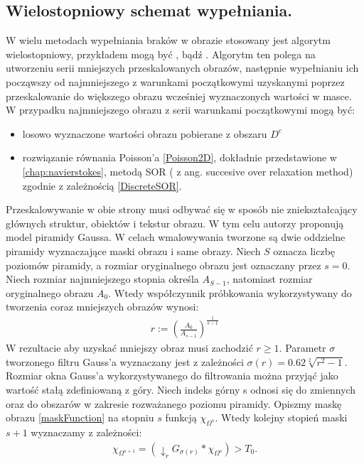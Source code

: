 \documentclass[12pt, twoside, openany]{report}
\theoremstyle{definition}
\begin{document}
\subsection{Wielostopniowy schemat wypełniania.}
W wielu metodach wypełniania braków w obrazie stosowany jest algorytm wielostopniowy, przykładem mogą być \cite{kawai2009image}, \cite{komodakis2007image} bądź \cite{wexler2007space}. Algorytm ten polega na utworzeniu serii mniejszych przeskalowanych obrazów, następnie wypełnianiu ich począwszy od najmniejszego z warunkami początkowymi uzyskanymi poprzez przeskalowanie do większego obrazu wcześniej wyznaczonych wartości w masce. W przypadku najmniejszego obrazu z serii warunkami początkowymi mogą być:
\begin{itemize}
\item
losowo wyznaczone wartości obrazu pobierane z obszaru $D^c$
\item
rozwiązanie równania Poisson'a \eqref{Poisson2D}, dokładnie przedstawione w \autoref{chap:navierstokes}, metodą SOR ( z ang. succesive over relaxation method) zgodnie z zależnością \eqref{DiscreteSOR}.
\end{itemize}
Przeskalowywanie w obie strony musi odbywać się w sposób nie zniekształcający głównych struktur, obiektów i tekstur obrazu. W tym celu autorzy \cite{arias2011variational} proponują model piramidy Gaussa. W celach wmalowywania tworzone są dwie oddzielne piramidy wyznaczające maski obrazu i same obrazy. Niech $S$ oznacza liczbę poziomów piramidy, a rozmiar oryginalnego obrazu jest oznaczany przez $s=0$. Niech rozmiar najmniejszego stopnia określa $A_{S-1}$, natomiast rozmiar oryginalnego obrazu $A_{0}$. Wtedy współczynnik próbkowania wykorzystywany do tworzenia coraz mniejszych obrazów wynosi:
\begin{align}
r := \left(\frac{A_0}{A_{s-1}}\right)^\frac{1}{s-1}
\end{align}
W rezultacie aby uzyskać mniejszy obraz musi zachodzić $r \geq 1$. Parametr $\sigma$ tworzonego filtru Gauss'a wyznaczany jest z zależności $\sigma(r)=0.62\sqrt[2]{r^2-1}$. Rozmiar okna Gauss'a wykorzystywanego do filtrowania można przyjąć jako wartość stałą zdefiniowaną z góry. Niech indeks górny s odnosi się do zmiennych oraz do obszarów w zakresie rozważanego poziomu piramidy. Opiszmy maskę obrazu \eqref{maskFunction} na stopniu $s$ funkcją $\chi_{\Omega^{s}}$. Wtedy kolejny stopień maski $s+1$ wyznaczamy z zależności:
\begin{align}
\chi_{\Omega^{s+1}}=(\downarrow_r G_{\sigma(r)} \ast \chi_{\Omega^s}) > T_{0}.
\end{align}
\end{document}
